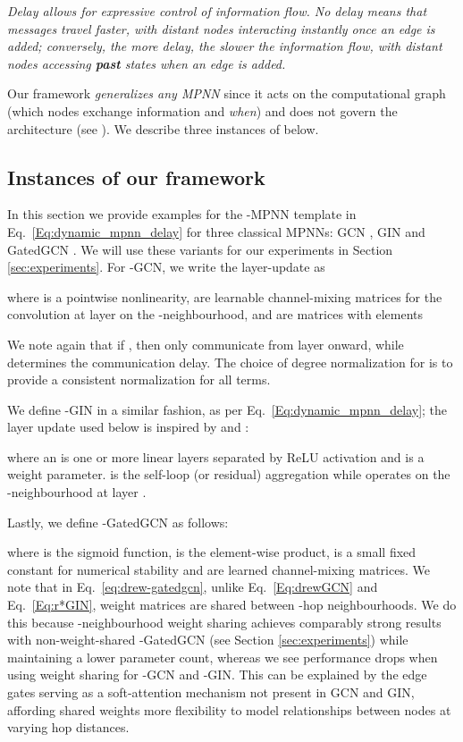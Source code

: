 \documentclass{article}
\theoremstyle{plain}
\theoremstyle{definition}
\theoremstyle{remark}
\begin{document}
{\em Delay allows for expressive control of information flow. No delay means that messages travel faster, with distant nodes interacting instantly once an edge is added; conversely, the more delay, the slower the information flow, with distant nodes accessing \textbf{past} states when an edge is added.}


Our framework \emph{generalizes any MPNN} since it acts on the computational graph (which nodes exchange information and {\em when}) and does not govern
the architecture (see ). We describe three instances of  below.








\subsection{Instances of our framework}
\label{sec:instances}
In this section we provide examples for the -MPNN template in Eq.~\eqref{Eq:dynamic_mpnn_delay} for three classical MPNNs: GCN \citep{kipf2016semi}, GIN \cite{xu2018powerful} and GatedGCN \cite{bresson2017residual}. We will use these variants for our experiments in Section \ref{sec:experiments}. For -GCN, we write the layer-update as

\noindent where  is a pointwise nonlinearity,  are learnable channel-mixing matrices for the convolution at layer  on the -neighbourhood, and  are matrices with elements

 \noindent We note again that if , then  only communicate
 from layer  onward, while  determines the communication delay. The choice of degree normalization for  is to provide a consistent normalization for all terms.


We define -GIN in a similar fashion, as per Eq.~\eqref{Eq:dynamic_mpnn_delay}; the layer update used below is inspired by \citet{brockschmidt2020gnn} and \citet{abboud2022shortest}:

where an  is one or more linear layers separated by ReLU activation and  is a weight parameter.  is the self-loop (or residual) aggregation while  operates on the -neighbourhood at layer .

Lastly, we define -GatedGCN as follows:

where  is the sigmoid function,  is the element-wise product,  is a small fixed constant for numerical stability and  are learned channel-mixing matrices. We note that in Eq.~\eqref{eq:drew-gatedgcn}, unlike Eq.~\eqref{Eq:drewGCN} and Eq.~\eqref{Eq:r*GIN}, weight matrices are shared between -hop neighbourhoods. We do this because -neighbourhood weight sharing achieves comparably strong results with non-weight-shared -GatedGCN (see Section \ref{sec:experiments}) while maintaining a lower parameter count, whereas we see performance drops when using weight sharing for -GCN and -GIN. This can be explained by the edge gates  serving as a soft-attention mechanism \cite{dwivedi2020benchmarking} not present in GCN and GIN, affording shared weights more flexibility to model relationships between nodes at varying hop distances.
\end{document}
